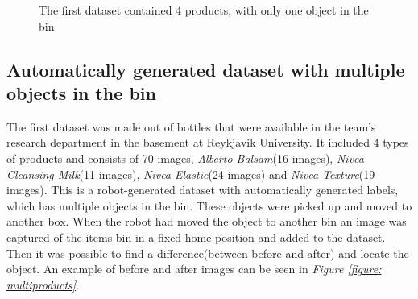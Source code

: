 \begin{figure}[h]
    \centering
    \hspace{2 cm}
    \hspace{2 cm}
    \hspace{2 cm}
    \caption{The first dataset contained 4 products, with only one object in the bin}
    \label{figure: products}
\end{figure}

\subsection{Automatically generated dataset with multiple objects in the bin} \label{sec:multidataset}
The first dataset was made out of bottles that were available in the team’s research department in the basement at Reykjavik University. It included 4 types of products and consists of 70 images, \textit{Alberto Balsam}(16 images), \textit{Nivea Cleansing Milk}(11 images), \textit{Nivea Elastic}(24 images) and \textit{Nivea Texture}(19 images). 
This is a robot-generated dataset with automatically generated labels, which has multiple objects in the bin. 
These objects were picked up and moved to another box. When the robot had moved the object to another bin an image was captured of the items bin in a fixed home position and added to the dataset. Then it was possible to find a difference(between before and after) and locate the object.
An example of before and after images can be seen in \textit{Figure \ref{figure: multiproducts}}. 

